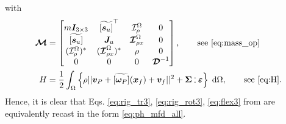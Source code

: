 \documentclass{svjour3}                     %
\newcommand{\crmat}[1]{\ensuremath{\widetilde{\left[#1\right]}}}
\def\onedot{$\mathsurround0pt\ldotp$}
\def\cddot{%
	\mathbin{\vcenter{\baselineskip.67ex
			\hbox{\onedot}\hbox{\onedot}}%
}}
\begin{document}
with
\begin{align*}
\bm{\mathcal{M}} &= 
\begin{bmatrix}
m \bm{I}_{3\times 3} & \crmat{\bm{s}_u}^\top & \mathcal{I}_\rho^{\Omega} & 0 \\
\crmat{\bm{s}_u} & \bm{J}_u & \bm{\mathcal{I}}_{\rho x}^{\Omega} & 0  \\
(\mathcal{I}_\rho^{\Omega})^* & (\bm{\mathcal{I}}_{\rho x}^{\Omega})^* & \rho & 0  \\
0 & 0 & 0 & \bm{\mathcal{D}}^{-1} \\
\end{bmatrix}, \qquad \text{see \eqref{eq:mass_op}} \\
H &= \frac{1}{2} \int_{\Omega} \left\{\rho ||\bm{v}_P + \crmat{\bm{\omega}_P} (\bm{x}_f) + {\bm{v}}_f||^2 + \bm\Sigma \cddot \bm\varepsilon \right\}  \d{\Omega}, \qquad \text{see \eqref{eq:H}}.
\end{align*}
Hence, it is clear that Eqs. \eqref{eq:rig_tr3}, \eqref{eq:rig_rot3}, \eqref{eq:flex3} from \cite{MB_Daepde,simeon2013computational} are equivalently recast in the form \eqref{eq:ph_mfd_all}.
%
 

\end{document}
